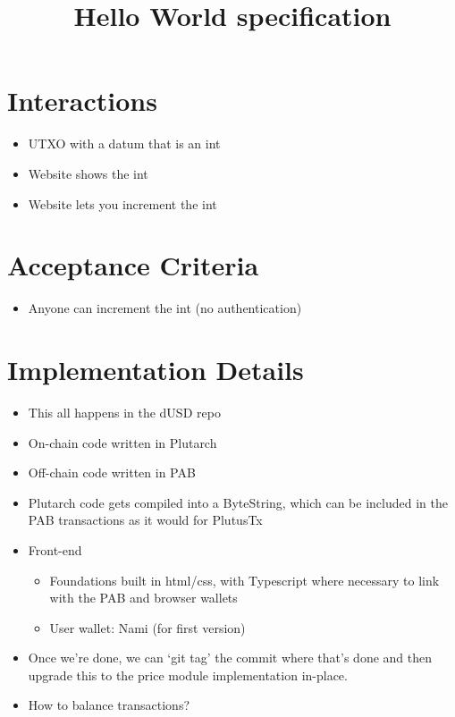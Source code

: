 \documentclass{article}
\title{Hello World specification}
\begin{document}
\maketitle

\section{Interactions}

\begin{itemize}
  \item UTXO with a datum that is an int
  \item Website shows the int
  \item Website lets you increment the int
\end{itemize}

\section{Acceptance Criteria}

\begin{itemize}
  \item Anyone can increment the int (no authentication)
\end{itemize}

\section{Implementation Details}

\begin{itemize}
  \item This all happens in the dUSD repo
  \item On-chain code written in Plutarch
  \item Off-chain code written in PAB
  \item Plutarch code gets compiled into a ByteString, which can be included in
    the PAB transactions as it would for PlutusTx
  \item Front-end
  \begin{itemize}
    \item Foundations built in html/css, with Typescript where necessary to link
      with the PAB and browser wallets
    \item User wallet: Nami (for first version)
  \end{itemize}
  \item Once we’re done, we can `git tag' the commit where that’s done and then
    upgrade this to the price module implementation in-place.
  \item How to balance transactions? 
\end{itemize}
\end{document}
